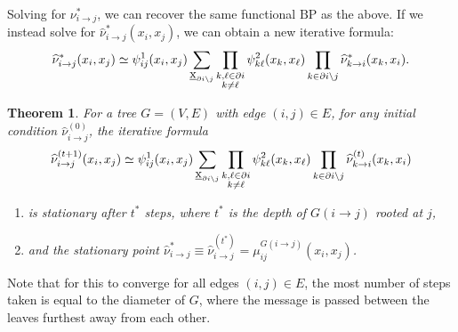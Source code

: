 \documentclass[12pt]{article}
\newtheorem{theorem}{Theorem}[section]
\newcommand{\BS}{\backslash}
\newcommand{\wh}[1]{\widehat{#1}}
\newcommand{\UBX}{\underbar{\textbf{\normalfont x}}}
\newcommand{\PI}{{\partial i}}
\newcommand{\RA}{\rightarrow}
\numberwithin{equation}{section}
\begin{document}
Solving for $\nu^*_{i\RA j}$, we can recover the same functional $\text{BP}$ as the above. If we instead solve for
$\wh{\nu}^*_{i\RA j}(x_i, x_j)$, we can obtain a new iterative formula:
\begin{equation}
    \wh{\nu}^*_{i\RA j}(x_i, x_j) \simeq \psi^1_{ij}(x_i, x_j)\sum_{\UBX_{\PI\BS j}}\prod_{\substack{k,\ell\in\PI\\k\neq\ell}}\psi^2_{k\ell}(x_k, x_\ell)\prod_{k\in\PI\BS j}\wh{\nu}^*_{k\RA i}(x_k, x_i).
\end{equation}

\begin{theorem}
    For a tree $G=(V, E)$ with edge $(i, j)\in E$, for any initial condition $\wh{\nu}^{(0)}_{i\RA j}$, the iterative formula
    \begin{equation*}
        \wh{\nu}^{(t+1)}_{i\RA j}(x_i, x_j) \simeq \psi^1_{ij}(x_i, x_j)\sum_{\UBX_{\PI\BS j}}\prod_{\substack{k,\ell\in\PI\\k\neq\ell}}\psi^2_{k\ell}(x_k, x_\ell)\prod_{k\in\PI\BS j}\wh{\nu}^{(t)}_{k\RA i}(x_k, x_i)
    \end{equation*}
    \begin{enumerate}
        \item is stationary after $t^*$ steps, where $t^*$ is the depth of $G(i\RA j)$ rooted at $j$,
        \item and the stationary point $\wh{\nu}^*_{i\RA j}\equiv\wh{\nu}^{(t^*)}_{i\RA j} = \mu^{G(i\RA j)}_{ij}(x_i, x_j)$.
    \end{enumerate}
\end{theorem}

Note that for this to converge for all edges $(i, j)\in E$, the most number of steps taken is equal to the diameter of $G$, where the message is
passed between the leaves furthest away from each other.
\end{document}
